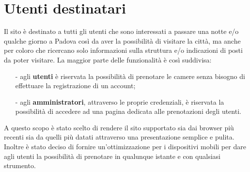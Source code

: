 \section{Utenti destinatari}
Il sito è destinato a tutti gli utenti che sono interessati a passare una notte e/o qualche giorno a Padova così da aver la possibilità di visitare la città,
ma anche per coloro che ricercano solo informazioni sulla struttura e/o indicazioni di posti da poter visitare.
La maggior parte delle funzionalità è così suddivisa:
\begin{itemize}
\item[-]agli \textbf{utenti} è riservata la possibilità di prenotare le camere senza bisogno di effettuare la registrazione di un account;
\item[-] agli \textbf{amministratori}, attraverso le proprie credenziali, è riservata la possibilità di accedere ad una pagina dedicata alle prenotazioni degli utenti.
\end{itemize}
A questo scopo è stato scelto di rendere il sito supportato sia dai browser più recenti sia da quelli più datati attraverso una presentazione semplice e pulita.
Inoltre è stato deciso di fornire un'ottimizzazione per i dispositivi mobili per dare agli utenti la possibilità di prenotare in qualunque istante e con qualsiasi strumento.
